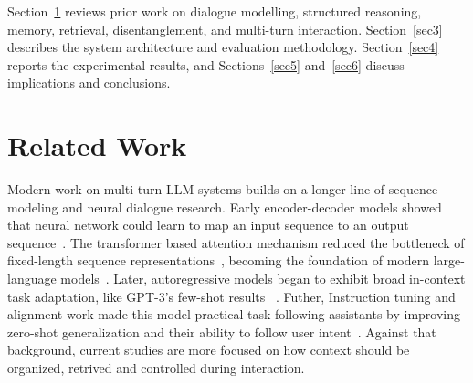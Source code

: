 \documentclass[pdflatex,sn-mathphys-num]{sn-jnl}%
\theoremstyle{thmstyleone}%
\theoremstyle{thmstyletwo}%
\theoremstyle{thmstylethree}%
\begin{document}
Section~\ref{sec2} reviews prior work on dialogue modelling, structured reasoning, memory, retrieval, disentanglement, and multi-turn interaction. Section~\ref{sec3} describes the system architecture and evaluation methodology. Section~\ref{sec4} reports the experimental results, and Sections~\ref{sec5} and~\ref{sec6} discuss implications and conclusions.




\section{Related Work}\label{sec2}






Modern work on multi-turn LLM systems builds on a longer line of sequence modeling  and neural dialogue research. Early encoder-decoder models showed that neural network could learn to map an input sequence to an output sequence~\cite{sutskever2014seq2seq}. The transformer based attention mechanism  reduced the bottleneck of fixed-length sequence representations~\cite{bahdanau2014attention}, becoming the foundation of modern large-language models~\cite{vaswani2017attention}. Later, autoregressive models began to exhibit broad in-context task adaptation, like GPT-3's few-shot results ~\cite{brown2020gpt3}. Futher, Instruction tuning and alignment work made this model practical task-following assistants by improving zero-shot generalization and their ability to follow user intent~\cite{wei2022flan,ouyang2022instructgpt}. Against that background, current studies are more focused on how context should be organized, retrived and controlled during interaction.
\end{document}
